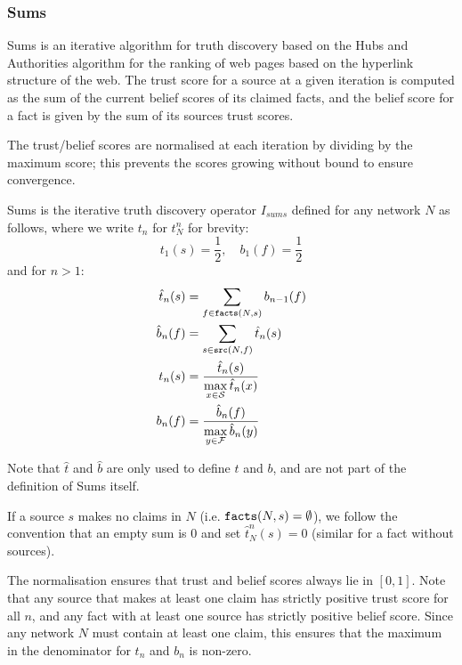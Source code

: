 \documentclass[../main.tex]{subfiles}
\begin{document}
\subsubsection{Sums}

Sums \cite{pasternack} is an iterative algorithm for truth discovery based on
the Hubs and Authorities \cite{kleinberg} algorithm for the ranking of web
pages based on the hyperlink structure of the web. The trust score for a source
at a given iteration is computed as the sum of the current belief scores of its
claimed facts, and the belief score for a fact is given by the sum of its
sources trust scores.

The trust/belief scores are normalised at each iteration by dividing by the
maximum score; this prevents the scores growing without bound to ensure
convergence.

\begin{definition}[Sums]
Sums is the iterative truth discovery operator $I_{sums}$ defined for any
network $N$ as follows, where we write $t_n$ for $t_N^n$ for brevity:
\[
    t_1(s) = \frac{1}{2}, \quad b_1(f) = \frac{1}{2}
\]
and for $n > 1$:
\begin{align*}
    \hat{t}_n(s) & = \sum_{f \in \texttt{facts}(N, s)}{b_{n - 1}(f)} \\
    \hat{b}_n(f) & = \sum_{s \in \texttt{src}(N, f)}{\hat{t}_n(s)} \\
    t_n(s) & = \frac{\hat{t}_n(s)}{\max\limits_{x \in \mathcal{S}}{\hat{t}_n(x)}} \\
    b_n(f) & = \frac{\hat{b}_n(f)}{\max\limits_{y \in \mathcal{F}}{\hat{b}_n(y)}}
\end{align*}

Note that $\hat{t}$ and $\hat{b}$ are only used to define $t$ and $b$, and are
not part of the definition of Sums itself.

If a source $s$ makes no claims in $N$ (i.e. $\texttt{facts}(N, s) = \emptyset$), we
follow the convention that an empty sum is 0 and set $\hat{t}_N^n(s)=0$
(similar for a fact without sources).
\end{definition}

\begin{remark}
The normalisation ensures that trust and belief scores always lie in $[0, 1]$.
Note that any source that makes at least one claim has strictly positive trust
score for all $n$, and any fact with at least one source has strictly positive
belief score. Since any network $N$ must contain at least one claim, this
ensures that the maximum in the denominator for $t_n$ and $b_n$ is non-zero.
\end{remark}
\end{document}
